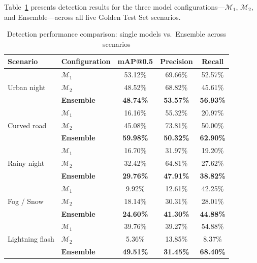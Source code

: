 \documentclass[pdflatex,sn-mathphys-num]{sn-jnl}%
\theoremstyle{thmstyleone}%
\theoremstyle{thmstyletwo}%
\theoremstyle{thmstylethree}%
\begin{document}
Table~\ref{tab:det_all} presents detection results for the three
model configurations---$\mathcal{M}_1$, $\mathcal{M}_2$, and
Ensemble---across all five Golden Test Set scenarios.

\begin{table}[t]
\centering
\caption{Detection performance comparison: single models vs.\ Ensemble
         across scenarios}
\label{tab:det_all}
%
\begin{tabular}{llccc}
\hline
\textbf{Scenario} & \textbf{Configuration}
  & \textbf{mAP@0.5} & \textbf{Precision} & \textbf{Recall} \\
\hline
\multirow{3}{*}{Urban night}
 & $\mathcal{M}_1$   & 53.12\% & 69.66\% & 52.57\% \\
 & $\mathcal{M}_2$   & 48.52\% & 68.82\% & 45.61\% \\
 & \textbf{Ensemble} & \textbf{48.74\%} & \textbf{53.57\%}
                     & \textbf{56.93\%} \\
\hline
\multirow{3}{*}{Curved road}
 & $\mathcal{M}_1$   & 16.16\% & 55.32\% & 20.97\% \\
 & $\mathcal{M}_2$   & 45.08\% & 73.81\% & 50.00\% \\
 & \textbf{Ensemble} & \textbf{59.98\%} & \textbf{50.32\%}
                     & \textbf{62.90\%} \\
\hline
\multirow{3}{*}{Rainy night}
 & $\mathcal{M}_1$   & 16.70\% & 31.97\% & 19.20\% \\
 & $\mathcal{M}_2$   & 32.42\% & 64.81\% & 27.62\% \\
 & \textbf{Ensemble} & \textbf{29.76\%} & \textbf{47.91\%}
                     & \textbf{38.82\%} \\
\hline
\multirow{3}{*}{Fog / Snow}
 & $\mathcal{M}_1$   &  9.92\% & 12.61\% & 42.25\% \\
 & $\mathcal{M}_2$   & 18.14\% & 30.31\% & 28.01\% \\
 & \textbf{Ensemble} & \textbf{24.60\%} & \textbf{41.30\%}
                     & \textbf{44.88\%} \\
\hline
\multirow{3}{*}{Lightning flash}
 & $\mathcal{M}_1$   & 39.76\% & 39.27\% & 54.88\% \\
 & $\mathcal{M}_2$   &  5.36\% & 13.85\% &  8.37\% \\
 & \textbf{Ensemble} & \textbf{49.51\%} & \textbf{31.45\%}
                     & \textbf{68.40\%} \\
\hline
\end{tabular}%
\end{table}
\end{document}
